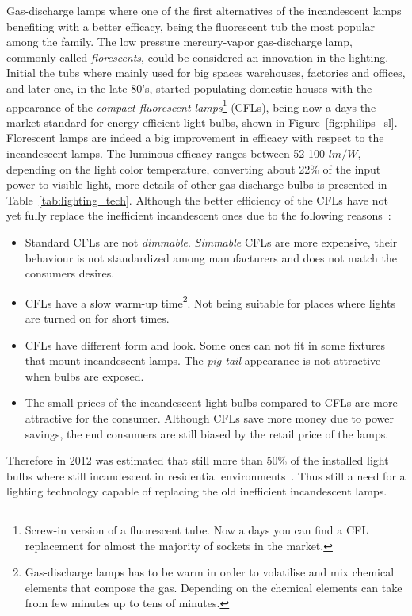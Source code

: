 Gas-discharge lamps where one of the first alternatives of the incandescent lamps benefiting with a better efficacy, being the fluorescent tub the most popular among the family. The low pressure mercury-vapor gas-discharge  lamp, commonly called \emph{florescents}, could be considered an innovation in the lighting. Initial the tubs where mainly used for big spaces warehouses, factories and offices, and later one, in the late 80's, started populating domestic houses with the appearance of the \emph{compact fluorescent lamps}\footnote{Screw-in version of a fluorescent tube. Now a days you can find a CFL replacement for almost the majority of sockets in the market.} (CFLs), being now a days the market standard for energy efficient light bulbs, shown in Figure~\ref{fig:philips_sl}. Florescent lamps are indeed a big improvement in efficacy with respect to the incandescent lamps. The luminous efficacy ranges between 52-100 $lm/W$, depending on the light color temperature, converting about 22\% of the input power to visible light, more details of other gas-discharge bulbs is presented in Table~\ref{tab:lighting_tech}. Although the better efficiency of the CFLs have not yet fully replace the inefficient incandescent ones due to the following reasons~\cite{11EPA}:


\begin{itemize}
  \item Standard CFLs are not \emph{dimmable}.  \emph{Simmable} CFLs are more expensive, their behaviour is not standardized among manufacturers and does not match the consumers desires.
  \item CFLs have a slow warm-up time\footnote{Gas-discharge lamps has to be warm in order to volatilise and mix chemical elements that compose the gas. Depending on the chemical elements can take from few minutes up to tens of minutes. }. Not being suitable for places where lights are turned on for short times.
  \item CFLs have different form and look. Some ones can not fit in some fixtures that mount incandescent lamps. The \emph{pig tail} appearance is not attractive when bulbs are exposed.
  \item The small prices of the incandescent light bulbs compared to CFLs are more attractive for the consumer. Although CFLs save more money due to power savings, the end consumers are still biased by the retail price of the lamps.
\end{itemize}
Therefore in 2012 was estimated that still more than 50\% of the installed light bulbs where still incandescent in residential environments~\cite{13A_LED}. Thus still a need for a lighting technology capable of replacing the old inefficient incandescent lamps.

